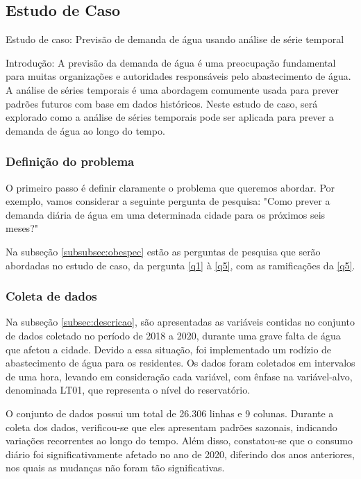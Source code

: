 \subsection{Estudo de Caso}

Estudo de caso: Previsão de demanda de água usando análise de série temporal

Introdução:
A previsão da demanda de água é uma preocupação fundamental para muitas organizações e autoridades responsáveis pelo abastecimento de água. A análise de séries temporais é uma abordagem comumente usada para prever padrões futuros com base em dados históricos. Neste estudo de caso, será explorado como a análise de séries temporais pode ser aplicada para prever a demanda de água ao longo do tempo.



\subsubsection{Defini\c c\~ao do problema}
O primeiro passo é definir claramente o problema que queremos abordar. Por exemplo, vamos considerar a seguinte pergunta de pesquisa: "Como prever a demanda diária de água em uma determinada cidade para os próximos seis meses?"


Na subseção \ref{subsubsec:obespec} estão as perguntas de pesquisa que serão abordadas no estudo de caso, da pergunta \ref{q1} à \ref{q5}, com as ramificações da \ref{q5}.

\subsubsection{Coleta de dados}

Na subseção \ref{subsec:descricao}, são apresentadas as variáveis contidas no conjunto de dados coletado no período de 2018 a 2020, durante uma grave falta de água que afetou a cidade. Devido a essa situação, foi implementado um rodízio de abastecimento de água para os residentes. Os dados foram coletados em intervalos de uma hora, levando em consideração cada variável, com ênfase na variável-alvo, denominada LT01, que representa o nível do reservatório.

O conjunto de dados possui um total de 26.306 linhas e 9 colunas. Durante a coleta dos dados, verificou-se que eles apresentam padrões sazonais, indicando variações recorrentes ao longo do tempo. Além disso, constatou-se que o consumo diário foi significativamente afetado no ano de 2020, diferindo dos anos anteriores, nos quais as mudanças não foram tão significativas.



